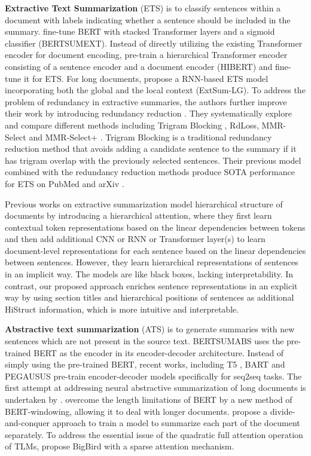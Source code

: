 \documentclass[11pt]{article}
\begin{document}
\textbf{Extractive Text Summarization} (ETS) is to 
classify sentences within a document with labels indicating whether a sentence should be included in the summary. 
\citet{presumm} fine-tune BERT with stacked Transformer layers and a sigmoid classifier (BERTSUMEXT). Instead of directly utilizing the existing Transformer encoder for document encoding, \citet{zhang-etal-2019-hibert} pre-train a hierarchical Transformer encoder consisting of a sentence encoder and a document encoder (HIBERT) and fine-tune it for ETS. 
For long documents, \citet{xiao-carenini-2019-extractive} propose a RNN-based ETS model incorporating both the global and the local context (ExtSum-LG). 
To address the problem of redundancy in extractive summaries, the authors further improve their work by introducing redundancy reduction  \cite{xiao-carenini-2020-systematically}. They systematically explore and compare different methods including Trigram Blocking \cite{paulus2018a}, RdLoss, MMR-Select and MMR-Select+ \cite{xiao-carenini-2020-systematically}. Trigram Blocking is a traditional redundancy reduction method that avoids adding a candidate sentence to the summary if it has trigram overlap with the previously selected sentences.
Their previous model combined with the redundancy reduction methods produce SOTA performance for ETS on PubMed and arXiv \cite{xiao-carenini-2020-systematically}.

Previous works on extractive summarization model hierarchical structure of documents by introducing a hierarchical attention, where they first learn contextual token representations based on the linear dependencies between tokens and then add additional CNN  \cite{cheng-lapata-2016-neural} or RNN \cite{summarunner}  or Transformer \cite{zhang-etal-2019-hibert, presumm} layer(s) to learn document-level representations for each sentence based on the linear dependencies between sentences. However, they learn hierarchical representations of sentences in an implicit way. The models are like black boxes, lacking interpretability. In contrast, our proposed approach enriches sentence representations in an explicit way by using section titles and hierarchical positions of sentences as additional HiStruct information, which is more intuitive and interpretable. 

\textbf{Abstractive text summarization} (ATS) is to generate summaries with new sentences which are not present in the source text. 
BERTSUMABS \cite{presumm} uses the pre-trained BERT as the encoder in its encoder-decoder architecture. Instead of simply using the pre-trained BERT, recent works, including T5 \cite{t5}, BART \cite{bart} and PEGAUSUS \cite{zhang2019pegasus} pre-train encoder-decoder models specifically for seq2seq tasks. The first attempt at addressing neural abstractive summarization of long documents is undertaken by \citet{pubmed}. \citet{aksenov2020i} overcome the length limitations of BERT by a new method of BERT-windowing, allowing it to deal with longer documents.
\citet{dancer2020} propose a divide-and-conquer approach to train a model to summarize each part of the document separately. To address the essential issue of the quadratic full attention operation of TLMs, \citet{bigbird} propose BigBird with a sparse attention mechanism.
\end{document}
